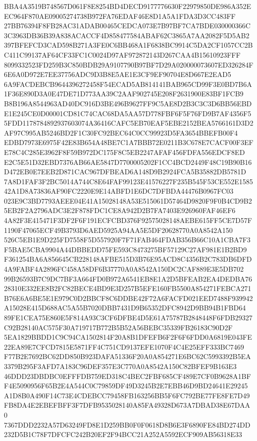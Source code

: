 \documentclass[UTF8,fontset=fandol,zihao=-4,a4paper]{ctexart}
\begin{document}
{{BBA4A3519B748567D061F8E8254BD4DECD9177776630F22979850DE986A352EEC964F870AE09005274738B972FA76EDAF46E8D1A5A1FDA3D3CC483FF
27BB76394F8FB28AC31ADAB00465CEDCA073E7B97BF7CA7BDE030000366C3C3963DB36B39A838ACACCF4D858477584ABAF62C3865A7AA2082F5D5AB2
397BFEFCD3CAD598B271A3FE0C6BB468A1F6838BC9914C5DA2CF1057CC2BC411C99137AF64CF33FC1C0024D97AF972872143D267CAA4B15610923FFF
8099332523FD259B3C850BDB29A9107790B97BF7D29A020000073607ED326284F6E6A0D972E7EE37756ADC9D3B8E5AE1E3CF9EF90704E8D667E2EAD5
6A9FACDEBCB9644396272458F54ECAD5AB814141BAB965CD99F3E0BD7B6A1F36E890D3A0E47DE71D773AA39C2AAF902745E208F2631900E83BF1FCB9
B8B196A8544963AD40DC916D3BE496B9627FF9C5AE8D2B3C3C3D6BB56EBDE1E245CE0D00001CD81C74CAC68DA5AA57D778FBF6F5F76FD9B7AF4356F5
5FDD1178784892937603074A36416CAFC5EB70EAF5EBE2152BEA5766161D3D2AF97C995AB5246BD2F1C30FC92BEC64C0CC99923D5FA3654BBEFB00F4
EDBD7973E6975F42E83B654A48BE7C1A7BBB72E0211B3C678E7CACF00F3EFE78C4C285E3962F8F59B972DC175F8C5EB2247AFAF456FDFA556EDCF8ED
E2C5E51D32EBD7376AB66AE5847D7700005202F1CC4BCD2449F48C19B90B16D472EB0E7EEB2D871CAC967DFBEAD6A148D9B2924FCA5B35882DB5781D
7A8D1FAF3F2BC5014A744C8E64FAF99123E41576227F235B545F53CE552E158542A1D8A73836AF90FC2220E9E14ABFD1E6DC7DFBDA44476B0967FC03
023E9C3BD7793AEEE04E41A15028148A53E515061D57464D9820F9F0B4CD9B25EB2F2A2796ADC3E2F878FDC1CE8A942D2B7FA7403E926960FAF46EF6
4A82F3E415471F3DF2F6F191ECFCBD376F92575028148AEBE615FF5CE7D57F1190F47065ECF49B3793D6AED5925A94AA5E5DF20628770A0A8542A150
526C5EB1E9D225FD7558F5D557920F7F71FAB464FDAB356B66C10A1CBA7F3F5BAE5CBA9904A44DBBEDD75FE593C8473275BF57129C27AF981E1B2BD9
F361254BA6A856645CB228148AFBE515D3B76E95ACD8C4356B2C783DB6DFD4A9FABF4A2896FC458A58DF6B37770A0A8542A150DC2CAF889E3E5DB702
99B26593B7C9DC7BF3A664FD0B972A6541EB8E1A2D5BFEAB2EA4DEDBA7628310E332EE8B2FC82BECE4BD9E3D257B5EFE160FB5500A854271FEBCA271
B76E6A6BE5E1E979C0D2BBCF8C6DDBE42F72A6FACFD021EED7488F939942A15028E415D688AC5A55B7020DBB7431D9B65352DFC8942D9BB94B1FBD64
89FE1CEA75E860E5F814A93C3CF6DFBE4D5E61A75787B2848448F6FDB29327C92B28140AC575F30A719717B772B5B52A56BEBC35339FB26183C90D2F
5EA1829BBDD1C9C94CA1502814F20A8B1DFEFB6F2F6F6FDD0A6819E043FE22EA89E7CFCD7815E5871FF4C751CD9137EFE1070F4C4E25EFF333BC7469
F77B2E7692BC62DD850B923DAFA51336F20A0A854271E6BC62C5993392B5EA3379B295F3AFD7A183C96DEF357E3C770A0A8542A150C82BFEF9B163E3
46DDD23DBDBC0EFFFDB759ED318C4BEC2FBF685CF489E7CF0B9628A1BFF4E5090956F65B2E4A544C0C79859DF49D3245B2E7EBB46D9BD24641E29245
A1D8B0A490F14C73E4CDEBCC79458FB163256BB5F6FC792BE77FE8FE7D49FB8DA4E2EBEFBFF3F7DFB9535028140A85FA49328D673A7DBAD38E67DAA0
7367DDD2232A57D63249FD8E1D259BB0F0F0618D8B6E3F6890FE84BD274DD232D5B1C78F7DFCFC242B20EF2F94BCC21A252A5592ECF909AB56318E33
}}
\end{document}
